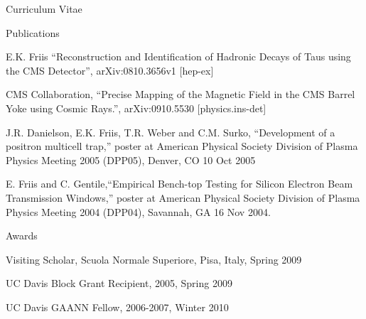 \documentclass[12pt]{amsart}
\begin{document}
\begin{cv}{Curriculum Vitae}
\begin{cvlist}{Publications}
\item
   E.K. Friis ``Reconstruction and Identification of Hadronic Decays of Taus using the CMS Detector'', arXiv:0810.3656v1 [hep-ex]
\item
   CMS Collaboration, ``Precise Mapping of the Magnetic Field in the CMS Barrel Yoke using Cosmic Rays.'', arXiv:0910.5530 [physics.ins-det]
\item 

\item
 J.R. Danielson, E.K. Friis, T.R. Weber and C.M. Surko, ``Development of a positron multicell trap,'' poster at American Physical Society Division of Plasma Physics Meeting 2005 (DPP05), Denver, CO 10 Oct 2005
\item
E. Friis and C. Gentile,``Empirical Bench-top Testing for Silicon Electron Beam Transmission Windows,'' poster at American Physical Society Division of Plasma Physics Meeting 2004 
(DPP04), Savannah, GA 16 Nov 2004. 
\end{cvlist}

\nocite{*}

\begin{cvlist}{Awards}
\item Visiting Scholar, Scuola Normale Superiore, Pisa, Italy, Spring 2009
\item UC Davis Block Grant Recipient, 2005, Spring 2009
\item UC Davis GAANN Fellow, 2006-2007, Winter 2010 
\end{cvlist}

\end{cv}
{}

\end{document}
